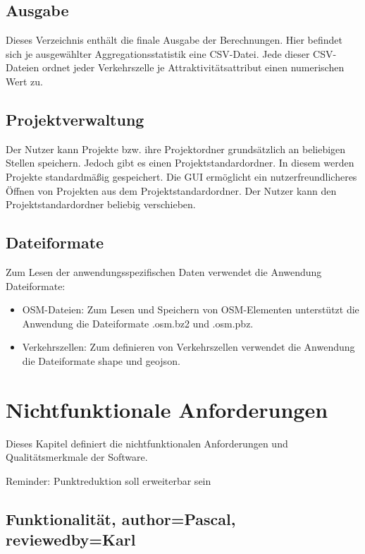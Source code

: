 \documentclass[parskip=full]{scrartcl} %
\begin{document}
\subsection*{Ausgabe}
Dieses Verzeichnis enthält die finale Ausgabe der Berechnungen. Hier befindet sich je ausgewählter Aggregationsstatistik eine CSV-Datei. Jede dieser CSV-Dateien ordnet jeder Verkehrszelle je Attraktivitätsattribut einen numerischen Wert zu.


\subsection*{Projektverwaltung}
Der Nutzer kann Projekte bzw. ihre Projektordner grundsätzlich an beliebigen Stellen speichern. Jedoch gibt es einen Projektstandardordner. In diesem werden Projekte standardmäßig gespeichert. Die GUI ermöglicht ein nutzerfreundlicheres Öffnen von Projekten aus dem Projektstandardordner. Der Nutzer kann den Projektstandardordner beliebig verschieben.

\subsection*{Dateiformate} \hypertarget{dataformat}{}
Zum Lesen der anwendungsspezifischen Daten verwendet die Anwendung Dateiformate:
\begin{itemize}
    \item OSM-Dateien: Zum Lesen und Speichern von OSM-Elementen unterstützt die Anwendung die Dateiformate .osm.bz2 und .osm.pbz.
    \item Verkehrszellen: Zum definieren von Verkehrszellen verwendet die Anwendung die Dateiformate shape und geojson.
\end{itemize}


\newpage







\section{Nichtfunktionale Anforderungen}

Dieses Kapitel definiert die nichtfunktionalen Anforderungen und Qualitätsmerkmale der Software.

Reminder: Punktreduktion soll erweiterbar sein



\subsection{Funktionalität, author=Pascal, reviewedby=Karl}
\end{document}

